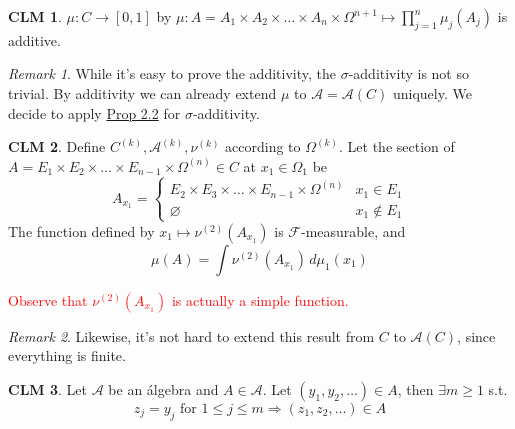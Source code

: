 \documentclass[hidelinks]{article}
\theoremstyle{definition}
\theoremstyle{dotless}
\newtheorem{claim}{CLM}[section]
\theoremstyle{remark}
\newtheorem*{remark}{Remark}
\begin{document}
\begin{claim}
$\mu:C\to[0,1]$ by $\mu:A=A_1\times A_2\times\dots\times A_n\times\Omega^{n+1}\mapsto\prod\limits_{j=1}^n\mu_j(A_j)$ is additive.
\end{claim}

\begin{remark}
While it's easy to prove the additivity, the $\sigma$-additivity is not so trivial. By additivity we can already extend $\mu$ to $\mathscr{A}=\mathscr{A}(C)$ uniquely. We decide to apply \hyperref[Prop 2.2]{Prop 2.2} for $\sigma$-additivity.
\end{remark}

\begin{claim}\label{CLM 12.38}
Define $C^{(k)},\mathscr{A}^{(k)},\nu^{(k)}$ according to $\Omega^{(k)}$. Let the section of $A=E_1\times E_2\times\dots\times E_{n-1}\times\Omega^{(n)}\in C$ at $x_1\in\Omega_1$ be
\[A_{x_1}=\begin{cases}
  E_2\times E_3\times\dots\times E_{n-1}\times\Omega^{(n)} & x_1\in E_1\\
  \varnothing & x_1\not\in E_1
\end{cases}\] 
The function defined by $x_1\mapsto\nu^{(2)}(A_{x_1})$ is $\mathscr{F}$-measurable, and
\[\mu(A)=\int\nu^{(2)}(A_{x_1})\,d\mu_1(x_1)\]
\end{claim}
\textcolor{red}{Observe that $\nu^{(2)}(A_{x_1})$ is actually a simple function.}
\begin{remark}
Likewise, it's not hard to extend this result from $C$ to $\mathscr{A}(C)$, since everything is finite.
\end{remark}

\begin{claim}\label{CLM 12.39}
Let $\mathscr{A}$ be an álgebra and $A\in\mathscr{A}$. Let $(y_1,y_2,\dots)\in A$, then $\exists m\geq1$ s.t.
\[z_j=y_j\textrm{ for }1\leq j\leq m\Rightarrow(z_1,z_2,\dots)\in A\]
\end{claim}
\end{document}
